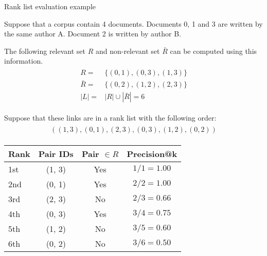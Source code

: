 \begin{example}
  \centering
  \caption{Rank list evaluation example}
  \label{ex:rank_list_eval}

  \begin{subexample}{\linewidth}

    Suppose that a corpus contain 4 documents.
    Documents 0, 1 and 3 are written by the same author A.
    Document 2 is written by author B.

    The following relevant set $R$ and non-relevant set $\bar{R}$ can be computed using this information.
    \begin{gather*}
      \begin{split}
              R =& \{(0, 1), (0, 3), (1, 3) \} \\
        \bar{R} =& \{(0, 2), (1, 2), (2, 3) \} \\
            |L| =& |R| \cup |\bar{R}| = 6
      \end{split}
    \end{gather*}

    Suppose that these links are in a rank list with the following order:
    \begin{gather*}
      \begin{split}
        ((1, 3), (0, 1), (2, 3), (0, 3), (1, 2), (0, 2))
      \end{split}
    \end{gather*}
  \end{subexample}

  \vspace{0.5cm}

  \begin{subexample}{\linewidth}
    \centering
    \begin{tabular}{l c c c}
      \toprule
      Rank  & Pair IDs & Pair $\in R$ & Precision@k\\
      \midrule
      1st   & (1, 3)   & Yes  & $1/1 = 1.00$ \\
      2nd   & (0, 1)   & Yes  & $2/2 = 1.00$ \\
      3rd   & (2, 3)   & No   & $2/3 = 0.66$ \\
      4th   & (0, 3)   & Yes  & $3/4 = 0.75$ \\
      5th   & (1, 2)   & No   & $3/5 = 0.60$ \\
      6th   & (0, 2)   & No   & $3/6 = 0.50$ \\
      \bottomrule
    \end{tabular}
  \end{subexample}


\end{example}
